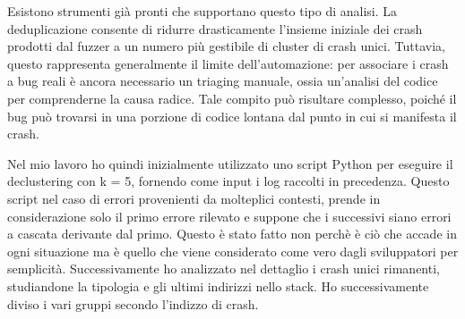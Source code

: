 Esistono strumenti già pronti che supportano questo tipo di analisi. La deduplicazione consente di ridurre drasticamente l’insieme iniziale dei crash prodotti dal fuzzer a un numero più gestibile di cluster di crash unici. Tuttavia, questo rappresenta generalmente il limite dell’automazione: per associare i crash a bug reali è ancora necessario un triaging manuale, ossia un’analisi del codice per comprenderne la causa radice. Tale compito può risultare complesso, poiché il bug può trovarsi in una porzione di codice lontana dal punto in cui si manifesta il crash.

Nel mio lavoro ho quindi inizialmente utilizzato uno script Python per eseguire il declustering con k = 5, fornendo come input i log raccolti in precedenza. Questo script nel caso di errori provenienti da molteplici contesti, prende in considerazione solo il primo errore rilevato e suppone che i successivi siano errori a cascata derivante dal primo. Questo è stato fatto non perchè è ciò che accade in ogni situazione ma è quello che viene considerato come vero dagli sviluppatori per semplicità.  Successivamente ho analizzato nel dettaglio i crash unici rimanenti, studiandone la tipologia e gli ultimi indirizzi nello stack. Ho successivamente diviso i vari gruppi secondo l’indizzo di crash. 
